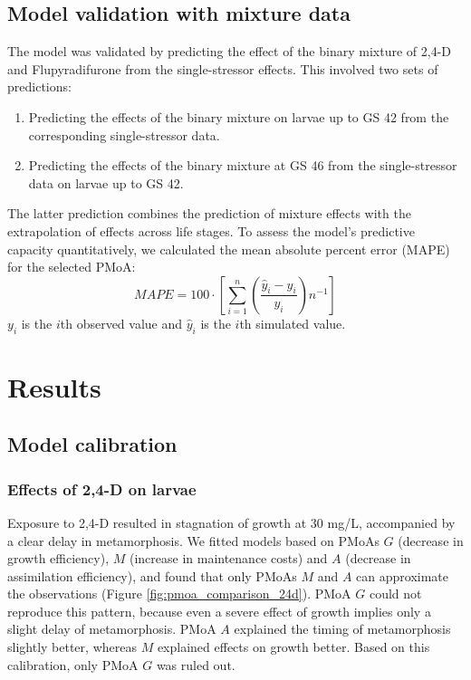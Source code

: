 \documentclass[preprint,12pt]{elsarticle}
\begin{document}
\subsection{Model validation with mixture data}
%
The model was validated by predicting the effect of the binary mixture of 2,4-D and Flupyradifurone from 
the single-stressor effects.
This involved two sets of predictions: 
\begin{enumerate}
    \item Predicting the effects of the binary mixture on larvae up to GS 42 from the corresponding single-stressor data.
    \item Predicting the effects of the binary mixture at GS 46 from the single-stressor data on larvae up to GS 42.
\end{enumerate}
%
The latter prediction combines the prediction of mixture effects with the extrapolation of effects across life stages.
%
To assess the model's predictive capacity quantitatively, we calculated the mean absolute percent error (MAPE) 
for the selected PMoA: 
\begin{equation}
    MAPE = 100 \cdot \left[ \sum\limits_{i=1}^{n} \left( \dfrac{\hat{y}_i - y_i}{y_i} \right) n^{-1}  \right]
    \label{eq:mape}
\end{equation}
%
$y_i$ is the $i$th observed value and $\hat{y}_i$ is the $i$th simulated value.

\section{Results}

\subsection{Model calibration}

\subsubsection{Effects of 2,4-D on larvae} 
%
Exposure to 2,4-D resulted in stagnation of growth at 30 mg/L, accompanied by a clear delay in metamorphosis. 
We fitted models based on PMoAs $G$ (decrease in growth efficiency), $M$ (increase in maintenance costs) and $A$ (decrease in assimilation efficiency), 
and found that only PMoAs $M$ and $A$ can approximate the observations (Figure \ref{fig:pmoa_comparison_24d}). 
PMoA $G$ could not reproduce this pattern, because even a severe effect of growth implies only a slight delay 
of metamorphosis. 
PMoA $A$ explained the timing of metamorphosis slightly better, whereas $M$ explained effects on growth better. 
Based on this calibration, only PMoA $G$ was ruled out.
\end{document}
